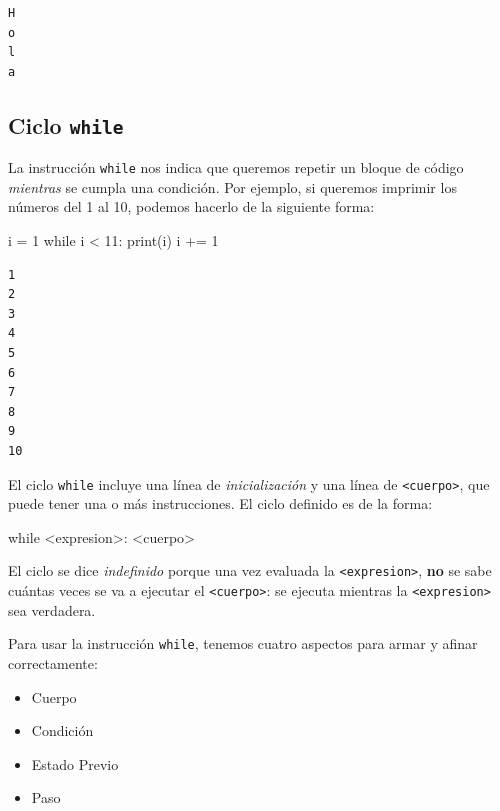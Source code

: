 \documentclass[
  letterpaper,
  DIV=11,
  numbers=noendperiod]{scrreprt}
\newenvironment{Shaded}{\begin{snugshade}}{\end{snugshade}}
\newcommand{\BuiltInTok}[1]{\textcolor[rgb]{0.00,0.23,0.31}{#1}}
\newcommand{\ControlFlowTok}[1]{\textcolor[rgb]{0.00,0.23,0.31}{#1}}
\newcommand{\DecValTok}[1]{\textcolor[rgb]{0.68,0.00,0.00}{#1}}
\newcommand{\NormalTok}[1]{\textcolor[rgb]{0.00,0.23,0.31}{#1}}
\newcommand{\OperatorTok}[1]{\textcolor[rgb]{0.37,0.37,0.37}{#1}}
\providecommand{\tightlist}{%
  \setlength{\itemsep}{0pt}\setlength{\parskip}{0pt}}\usepackage{longtable,booktabs,array}
\begin{document}
\begin{verbatim}
H
o
l
a
\end{verbatim}

\hypertarget{ciclo-while}{%
\subsection{\texorpdfstring{Ciclo
\texttt{while}}{Ciclo while}}\label{ciclo-while}}

La instrucción \texttt{while} nos indica que queremos repetir un bloque
de código \emph{mientras} se cumpla una condición. Por ejemplo, si
queremos imprimir los números del 1 al 10, podemos hacerlo de la
siguiente forma:

\begin{Shaded}
\begin{Highlighting}[]
\NormalTok{i }\OperatorTok{=} \DecValTok{1}
\ControlFlowTok{while}\NormalTok{ i }\OperatorTok{\textless{}} \DecValTok{11}\NormalTok{:}
    \BuiltInTok{print}\NormalTok{(i)}
\NormalTok{    i }\OperatorTok{+=} \DecValTok{1}
\end{Highlighting}
\end{Shaded}

\begin{verbatim}
1
2
3
4
5
6
7
8
9
10
\end{verbatim}

El ciclo \texttt{while} incluye una línea de \emph{inicialización} y una
línea de \texttt{\textless{}cuerpo\textgreater{}}, que puede tener una o
más instrucciones. El ciclo definido es de la forma:

\begin{Shaded}
\begin{Highlighting}[]
\ControlFlowTok{while} \OperatorTok{\textless{}}\NormalTok{expresion}\OperatorTok{\textgreater{}}\NormalTok{:}
    \OperatorTok{\textless{}}\NormalTok{cuerpo}\OperatorTok{\textgreater{}}
\end{Highlighting}
\end{Shaded}

El ciclo se dice \emph{indefinido} porque una vez evaluada la
\texttt{\textless{}expresion\textgreater{}}, \textbf{no} se sabe cuántas
veces se va a ejecutar el \texttt{\textless{}cuerpo\textgreater{}}: se
ejecuta mientras la \texttt{\textless{}expresion\textgreater{}} sea
verdadera.

Para usar la instrucción \texttt{while}, tenemos cuatro aspectos para
armar y afinar correctamente:

\begin{itemize}
\tightlist
\item
  Cuerpo
\item
  Condición
\item
  Estado Previo
\item
  Paso
\end{itemize}
\end{document}
